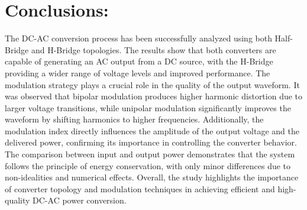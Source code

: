 \documentclass{article}
\begin{document}
\section*{Conclusions:}
The DC-AC conversion process has been successfully analyzed using both Half-Bridge and H-Bridge topologies. The results show that both converters are capable of generating an AC output from a DC source, with the H-Bridge providing a wider range of voltage levels and improved performance.
The modulation strategy plays a crucial role in the quality of the output waveform. It was observed that bipolar modulation produces higher harmonic distortion due to larger voltage transitions, while unipolar modulation significantly improves the waveform by shifting harmonics to higher frequencies.
Additionally, the modulation index directly influences the amplitude of the output voltage and the delivered power, confirming its importance in controlling the converter behavior.
The comparison between input and output power demonstrates that the system follows the principle of energy conservation, with only minor differences due to non-idealities and numerical effects.
Overall, the study highlights the importance of converter topology and modulation techniques in achieving efficient and high-quality DC-AC power conversion.
\end{document}
